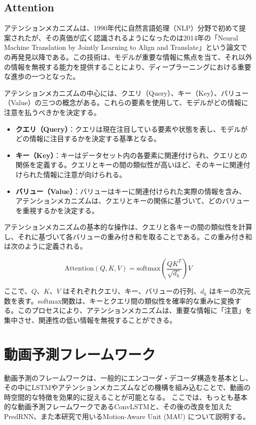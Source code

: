     \subsection{Attention}

    アテンションメカニズムは、1990年代に自然言語処理（NLP）分野で初めて提案されたが、その真価が広く認識されるようになったのは2014年の「Neural Machine Translation by Jointly Learning to Align and Translate」という論文での再発見以降である。この技術は、モデルが重要な情報に焦点を当て、それ以外の情報を無視する能力を提供することにより、ディープラーニングにおける重要な進歩の一つとなった。

    アテンションメカニズムの中心には、クエリ（Query）、キー（Key）、バリュー（Value）の三つの概念がある。これらの要素を使用して、モデルがどの情報に注意を払うべきかを決定する。

    \begin{itemize}
      \item \textbf{クエリ（Query）}：クエリは現在注目している要素や状態を表し、モデルがどの情報に注目するかを決定する基準となる。
      \item \textbf{キー（Key）}：キーはデータセット内の各要素に関連付けられ、クエリとの関係を定義する。クエリとキーの間の類似性が高いほど、そのキーに関連付けられた情報に注意が向けられる。
      \item \textbf{バリュー（Value）}：バリューはキーに関連付けられた実際の情報を含み、アテンションメカニズムは、クエリとキーの関係に基づいて、どのバリューを重視するかを決定する。
    \end{itemize}

    アテンションメカニズムの基本的な操作は、クエリと各キーの間の類似性を計算し、それに基づいて各バリューの重み付き和を取ることである。この重み付き和は次のように定義される。

    \begin{equation}
      \text{Attention}(Q, K, V) = \text{softmax}\left(\frac{QK^T}{\sqrt{d_k}}\right)V
    \end{equation}

    ここで、\( Q \)、\( K \)、\( V \) はそれぞれクエリ、キー、バリューの行列、\( d_k \) はキーの次元数を表す。softmax関数は、キーとクエリ間の類似性を確率的な重みに変換する。このプロセスにより、アテンションメカニズムは、重要な情報に「注意」を集中させ、関連性の低い情報を無視することができる。



  \section{動画予測フレームワーク}
    動画予測のフレームワークは、一般的にエンコーダ・デコーダ構造を基本とし、その中にLSTMやアテンションメカニズムなどの機構を組み込むことで、動画の時空間的な特徴を効果的に捉えることが可能となる。
    ここでは、もっとも基本的な動画予測フレームワークであるConvLSTMと、その後の改良を加えたPredRNN、また本研究で用いるMotion-Aware Unit (MAU) について説明する。

